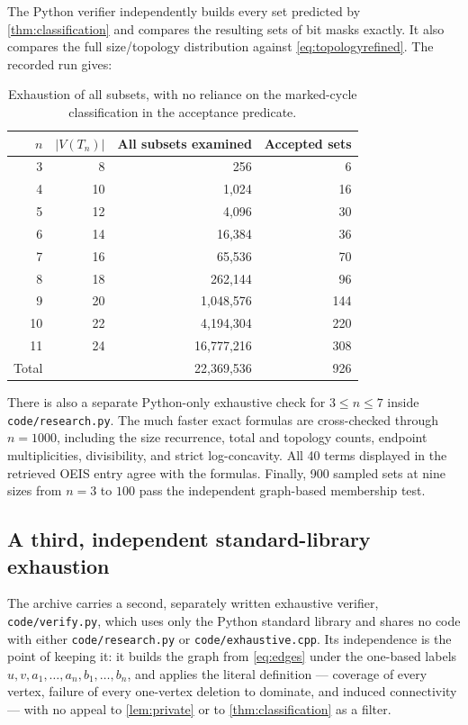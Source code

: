 \documentclass[11pt,letterpaper]{article}
\numberwithin{equation}{section}
\theoremstyle{definition}
\newcommand{\1}{\mathbf 1}
\begin{document}
The Python verifier independently builds every set predicted by
\cref{thm:classification} and compares the resulting sets of bit masks exactly.
It also compares the full size/topology distribution against
\eqref{eq:topologyrefined}. The recorded run gives:
\begin{table}[ht]
\centering
\begin{tabular}{rrrr}
\toprule
$n$ & $|V(T_n)|$ & All subsets examined & Accepted sets\\
\midrule
3&8&256&6\\
4&10&1,024&16\\
5&12&4,096&30\\
6&14&16,384&36\\
7&16&65,536&70\\
8&18&262,144&96\\
9&20&1,048,576&144\\
10&22&4,194,304&220\\
11&24&16,777,216&308\\
\midrule
Total&&22,369,536&926\\
\bottomrule
\end{tabular}
\caption{Exhaustion of all subsets, with no reliance on the marked-cycle
classification in the acceptance predicate.}
\end{table}
There is also a separate Python-only exhaustive check for $3\le n\le7$ inside
\texttt{code/research.py}.
The much faster exact formulas are cross-checked through $n=1000$, including
the size recurrence, total and topology counts, endpoint multiplicities,
divisibility, and strict log-concavity. All 40 terms displayed in the retrieved
OEIS entry agree with the formulas. Finally, 900 sampled sets at nine sizes
from $n=3$ to $100$ pass the independent graph-based membership test.

\subsection{A third, independent standard-library exhaustion}
\label{sec:secondverifier}
The archive carries a second, separately written exhaustive verifier,
\texttt{code/verify.py}, which uses only the Python standard library and shares
no code with either \texttt{code/research.py} or \texttt{code/exhaustive.cpp}.
Its independence is the point of keeping it: it builds the graph from
\eqref{eq:edges} under the one-based labels $u,v,a_1,\dots,a_n,b_1,\dots,b_n$,
and applies the literal definition --- coverage of every vertex, failure of
every one-vertex deletion to dominate, and induced connectivity --- with no
appeal to \cref{lem:private} or to \cref{thm:classification} as a filter.
\end{document}
